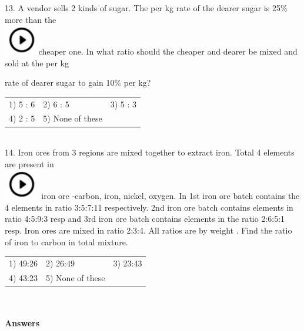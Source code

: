 \documentclass{article}
\begin{document}
13. A vendor sells 2 kinds of sugar. The per kg rate of the dearer sugar is 25\% more than the  
	\noindent \\ \includegraphics*[width=0.60in, height=0.52in]{images/image1}cheaper one. In what ratio should the cheaper and dearer be mixed and sold at the per kg

\noindent rate of dearer sugar to gain 10\% per kg?

\noindent 

\noindent \begin{tabular}{p{1.7in} p{1.6in} p{1.6in}} \\ 
 1) 5 : 6                     &  2) 6 : 5              &  3) 5 : 3              \\
4) 2 : 5              & 5) None of these  \\
\end{tabular}

\noindent  \\  14. Iron ores from 3 regions are mixed together to extract iron. Total 4 elements are present in  
	\noindent \\ \includegraphics*[width=0.60in, height=0.52in]{images/image1} iron ore -carbon, iron, nickel, oxygen. In 1st iron ore batch contains the 4 elements in ratio 3:5:7:11 respectively. 2nd iron ore batch contains elements in ratio 4:5:9:3 resp and 3rd iron ore batch contains elements in the ratio 2:6:5:1 resp. Iron ores are mixed in ratio 2:3:4. All ratios are by weight . Find the ratio of iron to carbon in total mixture.

\noindent \begin{tabular}{p{1.7in} p{1.6in} p{1.6in}} \\ 
 1) 49:26                   &  2) 26:49            &  3) 23:43             \\
4) 43:23            & 5) None of these  \\
\end{tabular}



\noindent  \\  

\noindent \\   \textbf{Answers}
\end{document}
